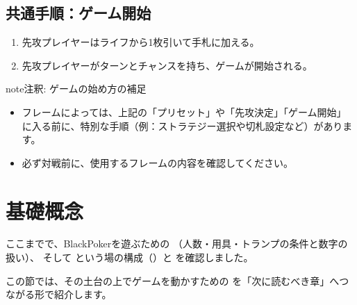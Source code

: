 \documentclass[letterpaper,10pt,dvipdfmx]{sphinxmanual}
\begin{document}
\subsection{共通手順：ゲーム開始}
\label{\detokenize{common/common:common-gamestart-start}}\label{\detokenize{common/common:id14}}\begin{enumerate}
%
\item {} 
\sphinxAtStartPar
先攻プレイヤーはライフから1枚引いて手札に加える。

\item {} 
\sphinxAtStartPar
先攻プレイヤーがターンとチャンスを持ち、ゲームが開始される。

\end{enumerate}

\begin{sphinxadmonition}{note}{注釈:}
\sphinxAtStartPar
ゲームの始め方の補足
\begin{itemize}
\item {} 
\sphinxAtStartPar
フレームによっては、上記の「プリセット」や「先攻決定」「ゲーム開始」に入る前に、特別な手順（例：ストラテジー選択や切札設定など）があります。

\item {} 
\sphinxAtStartPar
必ず対戦前に、使用するフレームの内容を確認してください。

\end{itemize}
\end{sphinxadmonition}


\section{基礎概念}
\label{\detokenize{common/common:id15}}
\sphinxAtStartPar
ここまでで、BlackPokerを遊ぶための  （人数・用具・トランプの条件と数字の扱い）、
そして  という場の構成（{\hyperref[\detokenize{common/common:zone-section}]{}}）と  を確認しました。

\sphinxAtStartPar
この節では、その土台の上でゲームを動かすための  を「次に読むべき章」へつながる形で紹介します。
\end{document}

